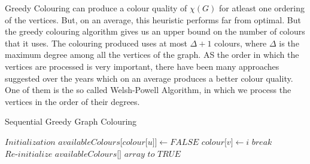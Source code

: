 \documentclass[MTech]{iitmdiss}
\begin{document}
Greedy Colouring can produce a colour quality of $\chi(G)$ for atleast one ordering of the vertices. But, on an average, this heuristic performs far from optimal. But the greedy colouring algorithm gives us an upper bound on the number of colours that it uses. The colouring produced uses at most $\Delta+1$ colours, where $\Delta$ is the maximum degree among all the vertices of the graph. AS the order in which the vertices are processed is very important, there have been many approaches suggested over the years which on an average produces a better colour quality. One of them is the so called Welsh-Powell Algorithm, in which we process the vertices in the order of their degrees.
\begin{algorithm}
\caption{Sequential Greedy Graph Colouring}\label{GreedyColouring}
\begin{algorithmic}[1]
\State $\textit{Initialization}$
\State $\textit{availableColours[colour[u]]} \gets FALSE$
\EndIf 
\EndFor
{}
\State $\textit{colour[v]} \gets i$
\State $\textit{break}$
\EndIf 
\EndFor
\State $\textit{Re-initialize availableColours[] array to TRUE}$
\EndFor
\EndProcedure
\end{algorithmic}
\end{algorithm}
\end{document}
